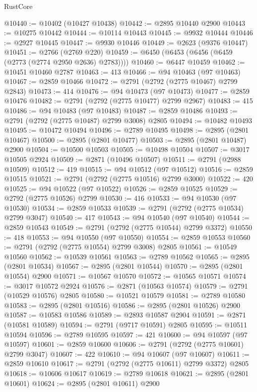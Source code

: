 \begin{lexlean}{RustCore}
\begin{coremodule}
@10440 := @10402 (@10427 @10438)
@10442 := @2895 @10440 @2900
@10443 := @10275 @10442
@10444 := @10114 @10443
@10445 := @9932 @10444
@10446 := @2927 @10445
@10447 := @9930 @10446
@10449 := @2623 (@9376 @10447)
@10451 := @2766 (@2769 @220)
@10459 := @6450 (@6453 (@6456 (@6459 (@2773 (@2774 @2950 @2636) @2783))))
@10460 := @6447 @10459
@10462 := @10451 @10460 @2787
@10463 := 413
@10466 := @94 @10463 (@97 @10463)
@10467 := @2859 @10466
@10472 := @2791 (@2792 (@2775 @10467) @2799 @2843)
@10473 := 414
@10476 := @94 @10473 (@97 @10473)
@10477 := @2859 @10476
@10482 := @2791 (@2792 (@2775 @10477) @2799 @2967)
@10483 := 415
@10486 := @94 @10483 (@97 @10483)
@10487 := @2859 @10486
@10493 := @2791 (@2792 (@2775 @10487) @2799 @3008) @2805
@10494 := @10482 @10493
@10495 := @10472 @10494
@10496 := @2789 @10495
@10498 := @2895 (@2801 @10467)
@10500 := @2895 (@2801 @10477)
@10503 := @2895 (@2801 @10487) @2900
@10504 := @10500 @10503
@10505 := @10498 @10504
@10507 := @3017 @10505 @2924
@10509 := @2871 (@10496 @10507)
@10511 := @2791 (@2988 @10509)
@10512 := 419
@10515 := @94 @10512 (@97 @10512)
@10516 := @2859 @10515
@10521 := @2791 (@2792 (@2775 @10516) @2799 @3000)
@10522 := 420
@10525 := @94 @10522 (@97 @10522)
@10526 := @2859 @10525
@10529 := @2792 (@2775 @10526) @2799
@10530 := 416
@10533 := @94 @10530 (@97 @10530)
@10534 := @2859 @10533
@10539 := @2791 (@2792 (@2775 @10534) @2799 @3047)
@10540 := 417
@10543 := @94 @10540 (@97 @10540)
@10544 := @2859 @10543
@10549 := @2791 (@2792 (@2775 @10544) @2799 @3372)
@10550 := 418
@10553 := @94 @10550 (@97 @10550)
@10554 := @2859 @10553
@10560 := @2791 (@2792 (@2775 @10554) @2799 @3008) @2805
@10561 := @10549 @10560
@10562 := @10539 @10561
@10563 := @2789 @10562
@10565 := @2895 (@2801 @10534)
@10567 := @2895 (@2801 @10544)
@10570 := @2895 (@2801 @10554) @2900
@10571 := @10567 @10570
@10572 := @10565 @10571
@10574 := @3017 @10572 @2924
@10576 := @2871 (@10563 @10574)
@10579 := @2791 (@10529 @10576) @2805
@10580 := @10521 @10579
@10581 := @2789 @10580
@10583 := @2895 (@2801 @10516)
@10586 := @2895 (@2801 @10526) @2900
@10587 := @10583 @10586
@10589 := @2893 @10587 @2904
@10591 := @2871 (@10581 @10589)
@10594 := @2791 (@9717 @10591) @2805
@10595 := @10511 @10594
@10596 := @2789 @10595
@10597 := 421
@10600 := @94 @10597 (@97 @10597)
@10601 := @2859 @10600
@10606 := @2791 (@2792 (@2775 @10601) @2799 @3047)
@10607 := 422
@10610 := @94 @10607 (@97 @10607)
@10611 := @2859 @10610
@10617 := @2791 (@2792 (@2775 @10611) @2799 @3372) @2805
@10618 := @10606 @10617
@10619 := @2789 @10618
@10621 := @2895 (@2801 @10601)
@10624 := @2895 (@2801 @10611) @2900

\end{coremodule}
\end{lexlean}
